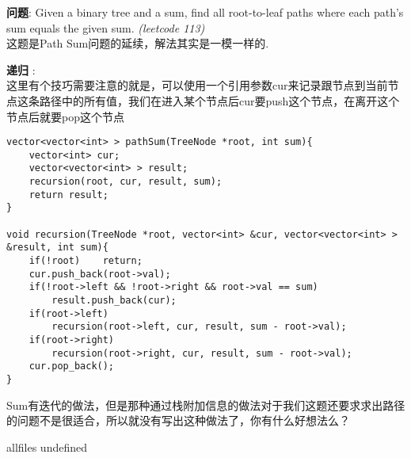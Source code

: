 \documentclass{article}
\begin{document}
\begin{CJK}{UTF8}{gbsn}     %

\else
    
\begin{description}
    \item{\textbf{问题}}: Given a binary tree and a sum, find all root-to-leaf paths where each path's sum equals the given sum. \textit{(leetcode 113)}
    \\这题是Path Sum问题的延续，解法其实是一模一样的.
    \item{\textbf{递归}} : 
    \\这里有个技巧需要注意的就是，可以使用一个引用参数cur来记录跟节点到当前节点这条路径中的所有值，我们在进入某个节点后cur要push这个节点，在离开这个节点后就要pop这个节点
    \begin{lstlisting}
vector<vector<int> > pathSum(TreeNode *root, int sum){
    vector<int> cur;
    vector<vector<int> > result;
    recursion(root, cur, result, sum);
    return result;
}

void recursion(TreeNode *root, vector<int> &cur, vector<vector<int> > &result, int sum){
    if(!root)    return;
    cur.push_back(root->val);
    if(!root->left && !root->right && root->val == sum)
        result.push_back(cur);
    if(root->left)
        recursion(root->left, cur, result, sum - root->val);
    if(root->right)
        recursion(root->right, cur, result, sum - root->val);
    cur.pop_back();
}
    \end{lstlisting}
     Sum有迭代的做法，但是那种通过栈附加信息的做法对于我们这题还要求求出路径的问题不是很适合，所以就没有写出这种做法了，你有什么好想法么？
\end{description}

\fi

\ifx allfiles undefined
\end{CJK}
\end{document}
